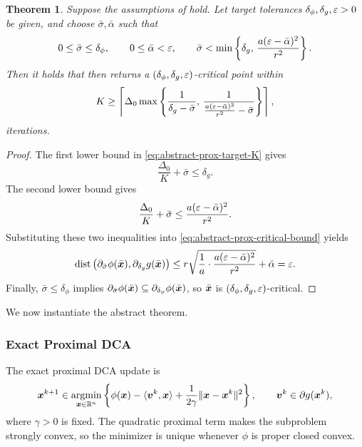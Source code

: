 \documentclass[english]{article}
\newtheorem{theorem}{Theorem}[section]
\begin{document}
\begin{theorem}
\label{thm:abstract-prox-target}
Suppose the assumptions of 
hold. Let target tolerances
$\delta_\phi,\delta_g,\varepsilon>0$ be given, and choose
$\bar\sigma,\bar\alpha$ such that
\begin{equation}
    0\le\bar\sigma\le\delta_\phi,
    \qquad
    0\le\bar\alpha<\varepsilon,
    \qquad
    \bar\sigma
    <
    \min\left\{
        \delta_g,\,
        \frac{a(\varepsilon-\bar\alpha)^2}{r^2}
    \right\}.
    \label{eq:abstract-prox-target-compatibility}
\end{equation}
Then it holds that then  returns a
$(\delta_\phi,\delta_g,\varepsilon)$-critical point within 
\begin{equation}
    K
    \ge
    \left\lceil
    \Delta_0
    \max\left\{
        \frac{1}{\delta_g-\bar\sigma},\,
        \frac{1}{
            \frac{a(\varepsilon-\bar\alpha)^2}{r^2}
            -
            \bar\sigma
        }
    \right\}
    \right\rceil ,
    \label{eq:abstract-prox-target-K}
\end{equation} iterations.

\end{theorem}

\begin{proof}
The first lower bound in \eqref{eq:abstract-prox-target-K} gives
\[
    \frac{\Delta_0}{K}+\bar\sigma
    \le
    \delta_g.
\]
The second lower bound gives
\[
    \frac{\Delta_0}{K}+\bar\sigma
    \le
    \frac{a(\varepsilon-\bar\alpha)^2}{r^2}.
\]
Substituting these two inequalities into
\eqref{eq:abstract-prox-critical-bound} yields
\[
    \operatorname{dist}
    \left(
        \partial_{\bar\sigma}\phi(\bar{\bm{x}}),
        \partial_{\delta_g}g(\bar{\bm{x}})
    \right)
    \le
    r\sqrt{
        \frac{1}{a}
        \cdot
        \frac{a(\varepsilon-\bar\alpha)^2}{r^2}
    }
    +\bar\alpha
    =
    \varepsilon .
\]
Finally, $\bar\sigma\le\delta_\phi$ implies
$\partial_{\bar\sigma}\phi(\bar{\bm{x}})
\subseteq
\partial_{\delta_\phi}\phi(\bar{\bm{x}})$, so $\bar{\bm{x}}$ is
$(\delta_\phi,\delta_g,\varepsilon)$-critical.
\end{proof}

We now instantiate the abstract theorem.

\subsubsection{Exact Proximal DCA}

The exact proximal DCA update is
\begin{equation}
    \bm{x}^{k+1}
    \in
    \operatorname*{\mathrm{argmin}}_{\bm{x}\in\mathbb{R}^n}
    \left\{
        \phi(\bm{x})-\langle\bm{v}^k,\bm{x}\rangle
        +
        \frac{1}{2\gamma}\|\bm{x}-\bm{x}^k\|^2
    \right\},
    \qquad
    \bm{v}^k\in\partial g(\bm{x}^k),
    \label{eq:exact-prox-dca-step}
\end{equation}
where $\gamma>0$ is fixed. The quadratic proximal term makes the
subproblem strongly convex, so the minimizer is unique whenever
$\phi$ is proper closed convex.
\end{document}
